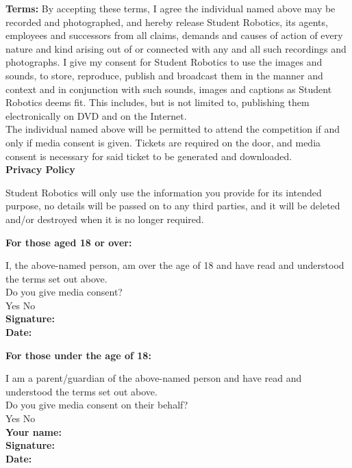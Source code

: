 \documentclass[a4paper,12pt]{article}
\newcommand{\checkbox}[1]{#1\hspace{0.2cm}\raisebox{-0.3mm}{$\square$}}
\newcommand{\textfield}[1]{\textbf{#1:} \hrulefill\hspace{0mm}}
\newcommand{\fieldsep}{\\[2.5mm]}
\begin{document}
\textbf{Terms:} By accepting these terms, I agree the individual named above may be recorded and photographed, and hereby release Student Robotics, its agents, employees and successors from all claims, demands and causes of action of every nature and kind arising out of or connected with any and all such recordings and photographs.
I give my consent for Student Robotics to use the images and sounds, to store, reproduce, publish and broadcast them in the manner and context and in conjunction with such sounds, images and captions as Student Robotics deems fit.
This includes, but is not limited to, publishing them electronically on DVD and on the Internet.\\

The individual named above will be permitted to attend the competition if and only if media consent is given.
Tickets are required on the door, and media consent is necessary for said ticket to be generated and downloaded.\\


\textbf{\large Privacy Policy}\\\vspace{-3mm}

Student Robotics will only use the information you provide for its intended purpose, no details will be passed on to any third parties, and it will be deleted and/or destroyed when it is no longer required.


\begin{minipage}[t]{0.48\textwidth}
\textbf{For those aged 18 or over:}

I, the above-named person, am over the age of 18 and have read and understood the terms set out above.\\

Do you give media consent? \\[2mm]
\checkbox{Yes} \hspace{1cm} \checkbox{No}\\

\textfield{Signature} \fieldsep
\textfield{Date}
\end{minipage}
\hspace{0.02\textwidth}
\begin{minipage}[t]{0.48\textwidth}
\textbf{For those under the age of 18:}

I am a parent/guardian of the above-named person and have read and understood the terms set out above.\\

Do you give media consent on their behalf?\\[2mm]
\checkbox{Yes} \hspace{1cm} \checkbox{No}\\

\textfield{Your name} \fieldsep
\textfield{Signature} \fieldsep
\textfield{Date}
\end{minipage}
\end{document}
